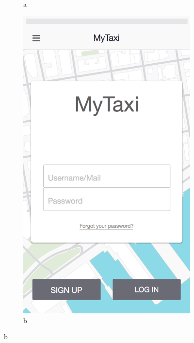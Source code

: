 \begin{figure}
\begin{subfigure}[b]{0.25\textwidth}
            \caption{a}
            \label{fig:a}
    \end{subfigure}
    \begin{subfigure}[b]{0.25\textwidth}
            \includegraphics[width=\textwidth]{mobileapppng/LogIn}
            \caption{b}
            \label{fig:b}
    \end{subfigure}


\end{figure}
